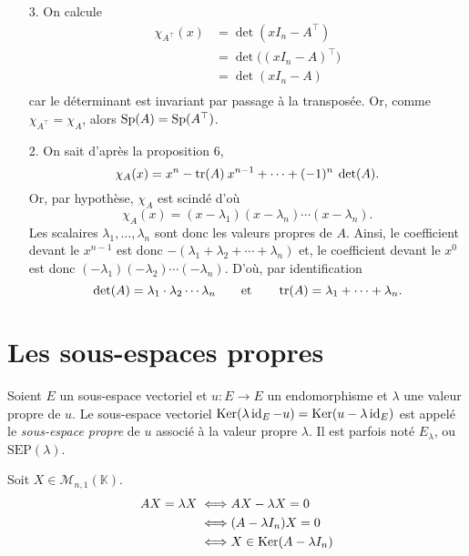 \begin{prv}
	\begin{enumerate}
		\item[3.] On calcule
			\begin{align*}
				\chi_{A^\top}(x) &= \det(xI_n - A^\top) \\
				&= \det\Big((xI_n - A)^\top\Big) \\
				&= \det(xI_n-A) \\
			\end{align*}
			car le déterminant est invariant par passage à la transposée.
			Or, comme $\chi_{A^\top} = \chi_A$, alors $\operatorname{Sp}(A) = \operatorname{Sp}(A^\top)$.
		\item[2.] On sait d'après la proposition 6, \[
				\chi_A(x) = x^n - \operatorname{tr}(A)\:x^{n-1} + \cdots + (-1)^{n}\:\operatorname{det}(A).
			\] Or, par hypothèse, $\chi_A$\/ est scindé d'où \[
				\chi_A(x) = (x - \lambda_1)(x-\lambda_n) \cdots (x-\lambda_n)
			.\] Les scalaires $\lambda_1,\ldots,\lambda_n$\/ sont donc les valeurs propres de $A$.
			Ainsi, le coefficient devant le $x^{n-1}$\/ est donc $-(\lambda_1 + \lambda_2 + \cdots + \lambda_n)$\/ et, le coefficient devant le $x^0$\/ est donc $(-\lambda_1)(-\lambda_2)\cdots(-\lambda_n)$. D'où, par identification \[
				\operatorname{det}(A) = \lambda_1\cdot \lambda_2\cdots \lambda_n\qquad\text{et}\qquad\operatorname{tr}(A) = \lambda_1 + \cdots + \lambda_n
			.\]
	\end{enumerate}
\end{prv}

\section{Les sous-espaces propres}

\begin{defn}
	Soient $E$\/ un sous-espace vectoriel et $u : E \to E$\/ un endomorphisme et $\lambda$\/ une valeur propre de $u$. Le sous-espace vectoriel $\operatorname{Ker}(\lambda \operatorname{id}_E - u) = \operatorname{Ker}(u - \lambda\operatorname{id}_E)$\/ est appelé le {\it sous-espace propre}\/ de $u$\/ associé à la valeur propre $\lambda$. Il est parfois noté $E_\lambda$, ou $\mathrm{SEP}(\lambda)$.
\end{defn}

Soit $X \in \mathscr{M}_{n,1}(\mathds{K})$.
\begin{align*}
	AX = \lambda X \iff& AX - \lambda X = 0\\
	\iff& (A-\lambda I_n) X = 0\\
	\iff& X \in \operatorname{Ker}(A - \lambda I_n)
\end{align*}

